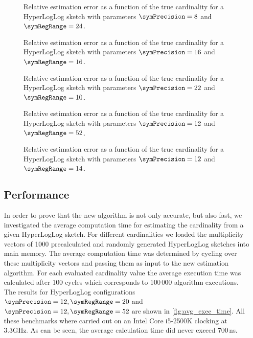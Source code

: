 \documentclass[a4paper]{scrartcl}
\begin{document}
\begin{figure}
\centering

\caption{Relative estimation error as a function of the true cardinality for a HyperLogLog sketch with parameters $\symPrecision = 8$ and $\symRegRange=24$.}
\label{fig:estimation_error_8_24}
\end{figure}

\begin{figure}
\centering

\caption{Relative estimation error as a function of the true cardinality for a HyperLogLog sketch with parameters $\symPrecision = 16$ and $\symRegRange=16$.}
\label{fig:estimation_error_16_16}
\end{figure}

\begin{figure}
\centering

\caption{Relative estimation error as a function of the true cardinality for a HyperLogLog sketch with parameters $\symPrecision = 22$ and $\symRegRange=10$.}
\label{fig:estimation_error_22_10}
\end{figure}

\begin{figure}
\centering

\caption{Relative estimation error as a function of the true cardinality for a HyperLogLog sketch with parameters $\symPrecision = 12$ and $\symRegRange=52$.}
\label{fig:estimation_error_12_52}
\end{figure}

\begin{figure}
\centering

\caption{Relative estimation error as a function of the true cardinality for a HyperLogLog sketch with parameters $\symPrecision = 12$ and $\symRegRange=14$.}
\label{fig:estimation_error_12_14}
\end{figure}

\subsection{Performance}
In order to prove that the new algorithm is not only accurate, but also fast, we investigated the average computation time for estimating the cardinality from a given HyperLogLog sketch. For different cardinalities we loaded the multiplicity vectors of 1000 precalculated and randomly generated HyperLogLog sketches into main memory. The average computation time was determined by cycling over these multiplicity vectors and passing them as input to the new estimation algorithm. For each evaluated cardinality value the average execution time was calculated after 100 cycles which corresponds to 100\,000 algorithm executions. The results for HyperLogLog configurations $\symPrecision=12, \symRegRange=20$ and $\symPrecision=12, \symRegRange=52$ are shown in \cref{fig:avg_exec_time}. All these benchmarks where carried out on an Intel Core i5-2500K clocking at 3.3GHz. As can be seen, the average calculation time did never exceed 700\,ns. 
\end{document}
